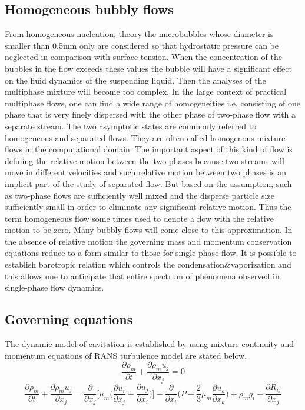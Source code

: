 \subsection{Homogeneous bubbly flows}
From homogeneous nucleation, theory \cite{FundamentalsofCavitation.2004}the microbubbles whose diameter is smaller than 0.5mm only are considered so that hydrostatic pressure can be neglected in comparison 
with surface tension. When the concentration of the bubbles in the flow exceeds these values the bubble will have a significant effect on the fluid dynamics of the suspending liquid.
Then the analyses of the multiphase mixture will become too complex. In the large context of practical multiphase flows, one can find a wide range of homogeneities i.e. consisting of one phase that is very finely 
dispersed with the other phase of two-phase flow with a separate stream. The two asymptotic states are commonly referred to homogeneous and separated flows. They are often called homogenous mixture flows in 
the computational domain. The important aspect of this kind of flow is defining the relative motion between the two phases because two streams will move in different velocities and such 
relative motion between two phases is an implicit part of the study of separated flow. But based on the assumption, such as two-phase flows are sufficiently well mixed and the disperse 
particle size sufficiently small in order to eliminate any significant relative motion. Thus the term homogeneous flow some times used to denote a flow with the relative motion to be zero. 
Many bubbly flows will come close to this approximation. In the absence of relative motion the governing mass and momentum conservation equations reduce to a form similar to those for single phase flow.
It is possible to establish barotropic relation which controls the condensation$\&$vaporization and this allows one to anticipate that entire spectrum of phenomena observed in single-phase flow dynamics.
\subsection{Governing equations}
The dynamic model of cavitation is established by using mixture continuity and momentum equations of RANS turbulence model are stated below\cite{Zhao2021}.
\begin{equation}
\frac{\partial{{\rho}_m}}{\partial t} + \frac{\partial{{{\rho}_m} u_j}}{\partial{x_j}} = 0
\end{equation}
\begin{equation}
\frac{\partial{{\rho}_m}}{\partial t} + \frac{\partial{{{\rho}_m} u_j}}{\partial{x_j}} =\frac{\partial}{\partial{x_j}}\Bigg[{\mu}_m\Bigg(\frac{\partial{u_i}}{\partial{x_j}}+\frac{\partial{u_j}}{\partial{x_i}}\Bigg)\Bigg]
-\frac{\partial}{\partial{x_i}} \Bigg({P}+{\frac{2}{3}}{\mu}_m \frac{\partial{u_k}}{\partial{x_k}}\Bigg) + {{\rho}_m}g_i +\frac{\partial{R_{ij}}}{\partial{x_j}}
\end{equation}

